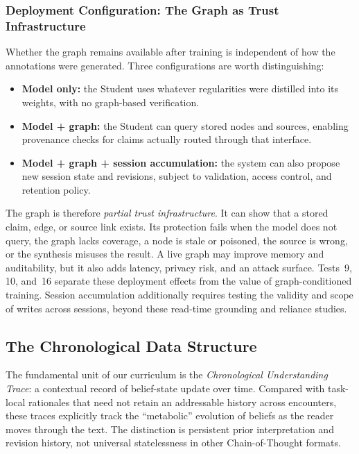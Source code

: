 \subsubsection{Deployment Configuration: The Graph as Trust Infrastructure}
\label{sec:deployment-config}

Whether the graph remains available after training is independent of how the
annotations were generated. Three configurations are worth distinguishing:

\begin{itemize}[leftmargin=*]
    \item \textbf{Model only:} the Student uses whatever regularities were
    distilled into its weights, with no graph-based verification.
    \item \textbf{Model + graph:} the Student can query stored nodes and
    sources, enabling provenance checks for claims actually routed through that
    interface.
    \item \textbf{Model + graph + session accumulation:} the system can also
    propose new session state and revisions, subject to validation, access
    control, and retention policy.
\end{itemize}

The graph is therefore \emph{partial trust infrastructure}. It can show that a
stored claim, edge, or source link exists. Its protection fails when the model
does not query, the graph lacks coverage, a node is stale or poisoned, the
source is wrong, or the synthesis misuses the result. A live graph may improve
memory and auditability, but it also adds latency, privacy risk, and an attack
surface. Tests~9, 10, and~16 separate these deployment effects from the value of
graph-conditioned training. Session accumulation additionally requires testing the validity and scope of
writes across sessions, beyond these read-time grounding and reliance studies.


\subsection{The Chronological Data Structure}
\label{sec:data-structure}

The fundamental unit of our curriculum is the \emph{Chronological Understanding Trace}: a contextual record of belief-state update over time. Compared with task-local rationales that need not retain an addressable history across encounters, these traces explicitly track the ``metabolic'' evolution of beliefs as the reader moves through the text. The distinction is persistent prior interpretation and revision history, not universal statelessness in other Chain-of-Thought formats.

